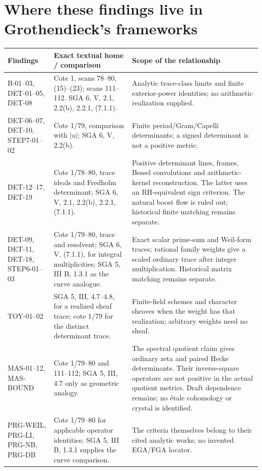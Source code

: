 \documentclass[11pt,a4paper]{article}
\begin{document}
\section{Where these findings live in Grothendieck's frameworks}
\begin{longtable}{>{\raggedright\arraybackslash}p{}>{\raggedright\arraybackslash}p{}>{\raggedright\arraybackslash}p{}}
\toprule
Findings & Exact textual home / comparison & Scope of the relationship\\\midrule\endhead
B-01--03, DET-01--05, DET-08 & Cote 1, scans 78--80, (15)--(23); scans 111--112. SGA 6, V, 2.1, 2.2(b), 2.2.1, (7.1.1). & Analytic trace-class limits and finite exterior-power identities; no arithmetic realization supplied.\\
DET-06--07, DET-10, STEP7-01--02 & Cote 1/79, comparison with $|u|$; SGA 6, V, 2.2(b). & Finite period/Gram/Capelli determinants; a signed determinant is not a positive metric.\\
DET-12--17, DET-19 & Cote 1/78--80, trace ideals and Fredholm determinant; SGA 6, V, 2.1, 2.2(b), 2.2.1, (7.1.1). & Positive determinant lines, frames, Bessel convolutions and arithmetic-kernel reconstruction. The latter uses an RH-equivalent sign criterion. The natural boost flow is ruled out; historical finite matching remains separate.\\
DET-09, DET-11, DET-18, STEP6-01--03 & Cote 1/79--80, trace and resolvent; SGA 6, V, (7.1.1), for integral multiplicities; SGA 5, III B, 1.3.1 as the curve analogue. & Exact scalar prime-sum and Weil-form traces; rational family weights give a scaled ordinary trace after integer multiplication. Historical matrix matching remains separate.\\
TOY-01--02 & SGA 5, III, 4.7--4.8, for a realized sheaf trace; cote 1/79 for the distinct determinant trace. & Finite-field schemes and character sheaves when the weight has that realization; arbitrary weights need no sheaf.\\
MAS-01--12, MAS-BOUND & Cote 1/79--80 and 111--112; SGA 5, III, 4.7 only as geometric analogy. & The spectral quotient claim gives ordinary zeta and paired Hecke determinants. Their inverse-square operators are not positive in the actual quotient metrics. Draft dependence remains; no \'etale cohomology or crystal is identified.\\
PRG-WEIL, PRG-LI, PRG-NB, PRG-DB & Cote 1/79--80 for applicable operator identities; SGA 5, III B, 1.3.1 supplies the curve comparison. & The criteria themselves belong to their cited analytic works; no invented EGA/FGA locator.\\

\end{longtable}
\end{document}
